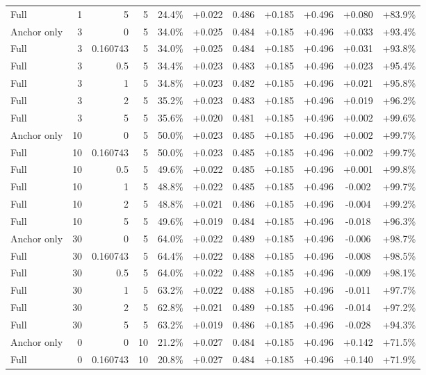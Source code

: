 \begin{table}[htbp]
\begin{tabular}{lrrrccccccc}
Full & 1 & 5 & 5 & 24.4\% & +0.022 & 0.486 & +0.185 & +0.496 & +0.080 & +83.9\% \\
Anchor only & 3 & 0 & 5 & 34.0\% & +0.025 & 0.484 & +0.185 & +0.496 & +0.033 & +93.4\% \\
Full & 3 & 0.160743 & 5 & 34.0\% & +0.025 & 0.484 & +0.185 & +0.496 & +0.031 & +93.8\% \\
Full & 3 & 0.5 & 5 & 34.4\% & +0.023 & 0.483 & +0.185 & +0.496 & +0.023 & +95.4\% \\
Full & 3 & 1 & 5 & 34.8\% & +0.023 & 0.482 & +0.185 & +0.496 & +0.021 & +95.8\% \\
Full & 3 & 2 & 5 & 35.2\% & +0.023 & 0.483 & +0.185 & +0.496 & +0.019 & +96.2\% \\
Full & 3 & 5 & 5 & 35.6\% & +0.020 & 0.481 & +0.185 & +0.496 & +0.002 & +99.6\% \\
Anchor only & 10 & 0 & 5 & 50.0\% & +0.023 & 0.485 & +0.185 & +0.496 & +0.002 & +99.7\% \\
Full & 10 & 0.160743 & 5 & 50.0\% & +0.023 & 0.485 & +0.185 & +0.496 & +0.002 & +99.7\% \\
Full & 10 & 0.5 & 5 & 49.6\% & +0.022 & 0.485 & +0.185 & +0.496 & +0.001 & +99.8\% \\
Full & 10 & 1 & 5 & 48.8\% & +0.022 & 0.485 & +0.185 & +0.496 & -0.002 & +99.7\% \\
Full & 10 & 2 & 5 & 48.8\% & +0.021 & 0.486 & +0.185 & +0.496 & -0.004 & +99.2\% \\
Full & 10 & 5 & 5 & 49.6\% & +0.019 & 0.484 & +0.185 & +0.496 & -0.018 & +96.3\% \\
Anchor only & 30 & 0 & 5 & 64.0\% & +0.022 & 0.489 & +0.185 & +0.496 & -0.006 & +98.7\% \\
Full & 30 & 0.160743 & 5 & 64.4\% & +0.022 & 0.488 & +0.185 & +0.496 & -0.008 & +98.5\% \\
Full & 30 & 0.5 & 5 & 64.0\% & +0.022 & 0.488 & +0.185 & +0.496 & -0.009 & +98.1\% \\
Full & 30 & 1 & 5 & 63.2\% & +0.022 & 0.488 & +0.185 & +0.496 & -0.011 & +97.7\% \\
Full & 30 & 2 & 5 & 62.8\% & +0.021 & 0.489 & +0.185 & +0.496 & -0.014 & +97.2\% \\
Full & 30 & 5 & 5 & 63.2\% & +0.019 & 0.486 & +0.185 & +0.496 & -0.028 & +94.3\% \\
Anchor only & 0 & 0 & 10 & 21.2\% & +0.027 & 0.484 & +0.185 & +0.496 & +0.142 & +71.5\% \\
Full & 0 & 0.160743 & 10 & 20.8\% & +0.027 & 0.484 & +0.185 & +0.496 & +0.140 & +71.9\% \\

\end{tabular}
\end{table}
